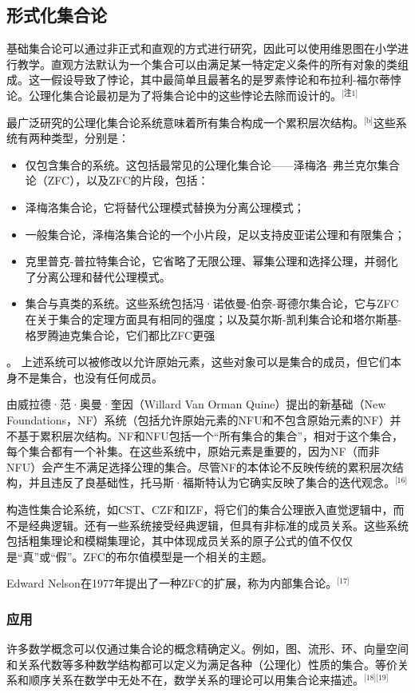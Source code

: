 \subsection{形式化集合论} 
基础集合论可以通过非正式和直观的方式进行研究，因此可以使用维恩图在小学进行教学。直观方法默认为一个集合可以由满足某一特定定义条件的所有对象的类组成。这一假设导致了悖论，其中最简单且最著名的是罗素悖论和布拉利-福尔蒂悖论。公理化集合论最初是为了将集合论中的这些悖论去除而设计的。\(^\text{[注1]}\)

最广泛研究的公理化集合论系统意味着所有集合构成一个累积层次结构。\(^\text{[b]}\)这些系统有两种类型，分别是：
\begin{itemize}
\item 仅包含集合的系统。这包括最常见的公理化集合论——泽梅洛–弗兰克尔集合论（ZFC），以及ZFC的片段，包括：
\item 泽梅洛集合论，它将替代公理模式替换为分离公理模式；
\item 一般集合论，泽梅洛集合论的一个小片段，足以支持皮亚诺公理和有限集合；
\item 克里普克-普拉特集合论，它省略了无限公理、幂集公理和选择公理，并弱化了分离公理和替代公理模式。
\item 集合与真类的系统。这些系统包括冯·诺依曼-伯奈-哥德尔集合论，它与ZFC在关于集合的定理方面具有相同的强度；以及莫尔斯-凯利集合论和塔尔斯基-格罗腾迪克集合论，它们都比ZFC更强
\end{itemize}。
上述系统可以被修改以允许原始元素，这些对象可以是集合的成员，但它们本身不是集合，也没有任何成员。

由威拉德·范·奥曼·奎因（Willard Van Orman Quine）提出的新基础（New Foundations，NF）系统（包括允许原始元素的NFU和不包含原始元素的NF）并不基于累积层次结构。NF和NFU包括一个“所有集合的集合”，相对于这个集合，每个集合都有一个补集。在这些系统中，原始元素是重要的，因为NF（而非NFU）会产生不满足选择公理的集合。尽管NF的本体论不反映传统的累积层次结构，并且违反了良基础性，托马斯·福斯特认为它确实反映了集合的迭代观念。\(^\text{[16]}\)

构造性集合论系统，如CST、CZF和IZF，将它们的集合公理嵌入直觉逻辑中，而不是经典逻辑。还有一些系统接受经典逻辑，但具有非标准的成员关系。这些系统包括粗集理论和模糊集理论，其中体现成员关系的原子公式的值不仅仅是“真”或“假”。ZFC的布尔值模型是一个相关的主题。

Edward Nelson在1977年提出了一种ZFC的扩展，称为内部集合论。\(^\text{[17]}\)
\subsubsection{应用}  
许多数学概念可以仅通过集合论的概念精确定义。例如，图、流形、环、向量空间和关系代数等多种数学结构都可以定义为满足各种（公理化）性质的集合。等价关系和顺序关系在数学中无处不在，数学关系的理论可以用集合论来描述。\(^\text{[18][19]}\)

